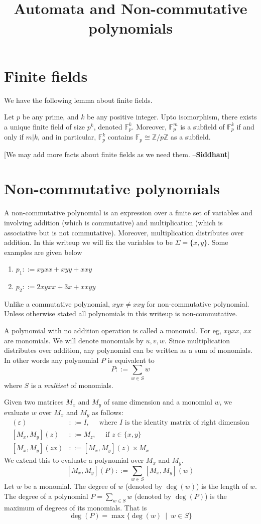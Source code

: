 \documentclass[english,course]{lecture}
\title{Automata and Non-commutative polynomials}
\newcommand{\Mxy}[1]{[M_x,M_y](#1)}
\newcommand{\degree}[1]{\deg(#1)}
\newcommand{\field}{\mathbb{F}}
\newcommand{\defs}{::=}
\newcommand\siddhant[1]{{\color{red} [#1 --\textbf{Siddhant}]}}
\begin{document}
\section{Finite fields}

We have the following lemma about finite fields. 

\begin{lemma}
    Let $p$ be any prime, and $k$ be any positive integer. Upto isomorphism, there exists a unique finite field of size $p^k$, denoted $\field_p^k$. Moreover, $\field_p^m$ is a subfield of $\field_p^k$ if and only if $m | k$, and in particular, $\field_p^k$ contains $\field_p\cong\mathbb{Z}/p\mathbb{Z}$ as a subfield. 
\end{lemma}

\siddhant{We may add more facts about finite fields as we need them.}

\section{Non-commutative polynomials}
A non-commutative polynomial is an expression over a finite set of variables and involving addition (which is commutative) and multiplication (which is associative but is not commutative). Moreover, multiplication distributes over addition. In this writeup we will fix the variables to be $\Sigma = \{x,y\}$. Some examples are given below
\begin{enumerate}
\item $p_1 \defs xyxx + xyy + xxy$
\item $p_2 \defs 2xyxx + 3x + xxyy$
\end{enumerate}
Unlike a commutative polynomial, $xyx \neq xxy$ for non-commutative polynomial. Unless otherwise stated all polynomials in this writeup is non-commutative.

A polynomial with no addition operation is called a monomial. For eg, $xyxx$, $xx$ are monomials. We will denote monomials by $u, v, w$. Since multiplication distributes over addition, any polynomial can be written as a sum of monomials. In other words any polynomial $P$ is equivalent to 
\[
P \defs \sum_{w \in S} w
\]
where $S$ is a \emph{multiset} of monomials.

Given two matrices $M_x$ and $M_y$ of same dimension and a monomial $w$, we evaluate $w$ over $M_x$ and $M_y$ as follows:
\begin{align*}
\Mxy \varepsilon & \defs I, \quad \text{ where $I$ is the identity matrix of right dimension}\\
\Mxy z & \defs M_z, \quad \text{   if $z \in \{x,y\}$} \\
\Mxy {zx} & \defs \Mxy z \times M_x
\end{align*}
We extend this to evaluate a polynomial over $M_x$ and $M_y$.
\[
\Mxy P \defs \sum_{w \in S} \Mxy w
\]
Let $w$ be a monomial. The degree of $w$ (denoted by $\degree w$) is the length of $w$. The degree of a polynomial $P=\sum_{w \in S} w$ (denoted by $\degree P$) is the maximum of degrees of its monomials. That is 
\[\degree P = \max \{\degree w \ \mid\ w \in S\}\]
\end{document}
